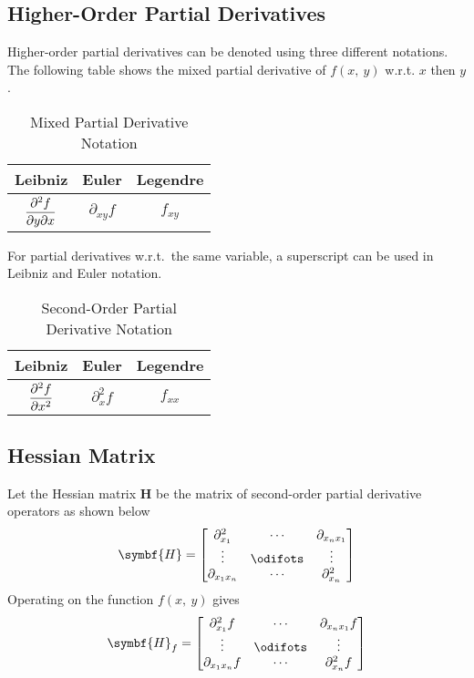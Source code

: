 \documentclass{article}
\begin{document}
\subsection{Higher-Order Partial Derivatives}
\begin{definition}
    Higher-order partial derivatives can be denoted using three different
    notations. The following table shows the mixed partial derivative of
    \(f(x,\: y)\) w.r.t. \(x\) then \(y\).
    \begin{table}[H]
        \centering
        \begin{tabular}{c c c}
            \toprule
            \textbf{Leibniz}               & \textbf{Euler}        & \textbf{Legendre} \\
            \midrule
            \(\displaystyle\pdv{f}{y}{x}\) & \(\partial_{x y}{f}\) & \(f_{x y}\)       \\
            \bottomrule
        \end{tabular}
        \caption{Mixed Partial Derivative Notation}
    \end{table}
    For partial derivatives w.r.t.\ the same variable, a superscript can be used
    in Leibniz and Euler notation.
    \begin{table}[H]
        \centering
        \begin{tabular}{c c c}
            \toprule
            \textbf{Leibniz}               & \textbf{Euler}        & \textbf{Legendre} \\
            \midrule
            \(\displaystyle\pdv[2]{f}{x}\) & \(\partial^2_{x}{f}\) & \(f_{x x}\)       \\
            \bottomrule
        \end{tabular}
        \caption{Second-Order Partial Derivative Notation}
    \end{table}
\end{definition}
\subsection{Hessian Matrix}
\begin{definition}
    Let the Hessian matrix \(\symbf{H}\) be the matrix of second-order partial
    derivative operators as shown below
    \begin{equation*}
        \symbf{H} =
        \mqty[
        \partial^2_{x_1} & \cdots & \partial_{x_n x_1} \\
        \vdots & \odifots & \vdots \\
        \partial_{x_1x_n} & \cdots & \partial^2_{x_n}
        ]
    \end{equation*}
    Operating on the function \(f(x,\: y)\) gives
    \begin{equation*}
        \symbf{H}_f =
        \mqty[
        \partial^2_{x_1}f & \cdots & \partial_{x_n x_1}f \\
        \vdots & \odifots & \vdots \\
        \partial_{x_1x_n}f & \cdots & \partial^2_{x_n}f
        ]
    \end{equation*}
\end{definition}
\end{document}
